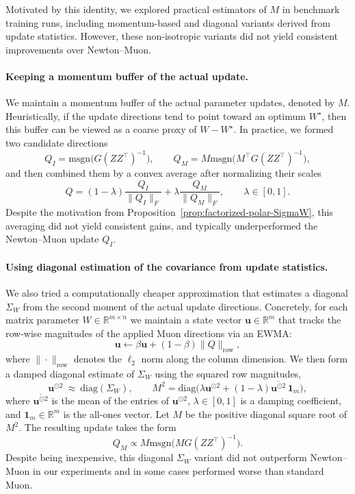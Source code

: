\documentclass[11pt]{article}
\begin{document}
Motivated by this identity, we explored practical estimators of ${M}$ in benchmark training runs, including momentum-based and diagonal variants derived from update statistics. However, these non-isotropic variants did not yield consistent improvements over Newton--Muon.

\paragraph{Keeping a momentum buffer of the actual update.}
We maintain a momentum buffer of the actual parameter updates, denoted by ${M}$.
Heuristically, if the update directions tend to point toward an optimum $W^\star$, then this buffer can be viewed as a coarse proxy of
${W}-W^\star$.
In practice, we formed two candidate directions
\[
{Q}_{I}
=
\mathrm{msgn} \big({G}({Z}{Z}^\top)^{-1}\big),
\qquad
{Q}_{M}
=
{M} \mathrm{msgn} \Big({M}^\top {G}({Z}{Z}^\top)^{-1}\Big),
\]
and then combined them by a convex average after normalizing their scales
\[
{Q}
=
(1-\lambda) \frac{{Q}_{I}}{\|{Q}_{I}\|_F}
+
\lambda \frac{{Q}_{M}}{\|{Q}_{M}\|_F},
\qquad \lambda\in[0,1].
\]
Despite the motivation from Proposition~\ref{prop:factorized-polar-SigmaW}, this averaging did not yield consistent gains, and typically underperformed
the Newton--Muon update ${Q}_{I}$.

\paragraph{Using diagonal estimation of the covariance from update statistics.}
We also tried a computationally cheaper approximation that estimates a diagonal ${\Sigma}_{{W}}$ from the second moment of the actual update directions. Concretely, for each matrix parameter ${W}\in\mathbb{R}^{m\times n}$ we maintain a state vector
$\boldsymbol{u}\in\mathbb{R}^{m}$ that tracks the row-wise magnitudes of
the applied Muon directions via an EWMA:
\[
\boldsymbol{u}\leftarrow \beta \boldsymbol{u}+(1-\beta) \big\|{Q}\big\|_{\text{row}},
\]
where $\|\cdot\|_{\text{row}}$ denotes the $\ell_2$ norm along the column dimension.
We then form a damped diagonal estimate of ${\Sigma}_{{W}}$ using the squared row magnitudes,
\[
\boldsymbol{u}^{\odot 2}\ \approx\ \mathrm{diag}({\Sigma}_{{W}}),
\qquad
{M}^2
=
\mathrm{diag} \Big(\lambda \boldsymbol{u}^{\odot 2} + (1-\lambda)\overline{\boldsymbol{u}^{\odot 2}}\, \mathbf{1}_m\Big),
\]
where $\overline{\boldsymbol{u}^{\odot 2}}$ is the mean of the entries of $\boldsymbol{u}^{\odot 2}$, $\lambda\in[0,1]$ is a damping coefficient, and $\mathbf{1}_m\in\mathbb{R}^m$ is the all-ones vector. Let ${M}$ be the positive diagonal square root of ${M}^2$. The resulting update takes the form
\[
{Q}_{M}
\propto
{M}
\mathrm{msgn} \Big({M}{G}({Z}{Z}^\top)^{-1}\Big).
\]
Despite being inexpensive, this diagonal ${\Sigma}_{{W}}$ variant did not outperform Newton--Muon in our experiments and in some cases performed worse than standard Muon.
\end{document}

